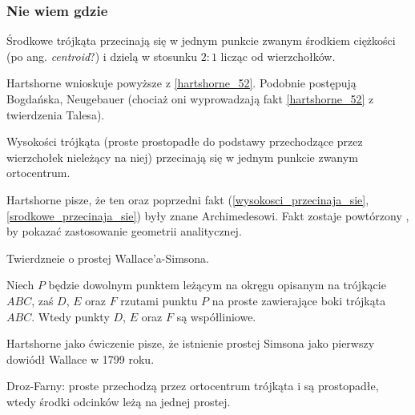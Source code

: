 \subsubsection{Nie wiem gdzie}

\begin{proposition}
	\label{srodkowe_przecinaja_sie}
	Środkowe trójkąta przecinają się w jednym punkcie zwanym środkiem ciężkości (po ang. \emph{centroid}?) i dzielą w stosunku $2 : 1$ licząc od wierzchołków.
\end{proposition}

Hartshorne \cite[s. 53, 54]{hartshorne2000} wnioskuje powyższe z \ref{hartshorne_52}.
Podobnie postępują Bogdańska, Neugebauer (chociaż oni wyprowadzają fakt \ref{hartshorne_52} z twierdzenia Talesa).

\begin{proposition}
	\label{wysokosci_przecinaja_sie}
	Wysokości trójkąta (proste prostopadłe do podstawy przechodzące przez wierzchołek nieleżący na niej) przecinają się w jednym punkcie zwanym ortocentrum.
\end{proposition}

Hartshorne \cite[s. 52, 54]{hartshorne2000} pisze, że ten oraz poprzedni fakt (\ref{wysokosci_przecinaja_sie}, \ref{srodkowe_przecinaja_sie}) były znane Archimedesowi.
Fakt zostaje powtórzony \cite[s. 119-120]{hartshorne2000}, by pokazać zastosowanie geometrii analitycznej.

Twierdzneie o prostej Wallace'a-Simsona. %


\begin{proposition}
	Niech $P$ będzie dowolnym punktem leżącym na okręgu opisanym na trójkącie $ABC$, zaś $D$, $E$ oraz $F$ rzutami punktu $P$ na proste zawierające boki trójkąta $ABC$.
	Wtedy punkty $D$, $E$ oraz $F$ są współliniowe.
\end{proposition}

Hartshorne jako ćwiczenie \cite[s. 61]{hartshorne2000} pisze, że istnienie prostej Simsona jako pierwszy dowiódł Wallace w 1799 roku.


Droz-Farny: proste przechodzą przez ortocentrum trójkąta i są prostopadłe, wtedy środki odcinków leżą na jednej prostej. %

%